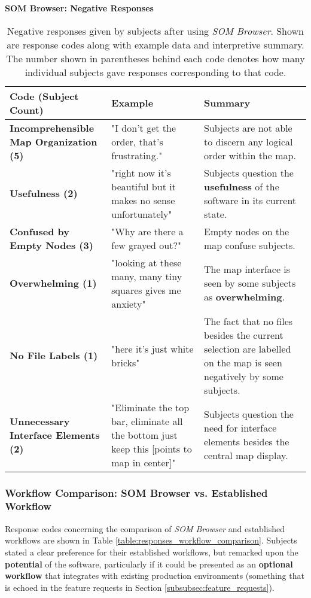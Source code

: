 \begin{table}[!htb]
  \renewcommand{\arraystretch}{1.2}
  \centering
  \textbf{SOM Browser: Negative Responses} \\ [3mm]
  \footnotesize
  \colorbox{light-bg}{
  \begin{tabular}{ p{4.0cm} p{4.75cm} p{4.75cm} }
  \hline
    \textbf{Code (Subject Count)} & \textbf{Example} & \textbf{Summary} \\
    \hline
    \textbf{Incomprehensible Map Organization (5)}
    &
    "I don't get the order, that’s frustrating."
    &
    Subjects are not able to discern any logical order within the map.
    \\
    \textbf{Usefulness (2)}
    &
    "right now it's beautiful but it makes no sense unfortunately"
    &
    Subjects question the \textbf{usefulness} of the software in its current
    state.
    \\
    \textbf{Confused by Empty Nodes (3)}
    &
    "Why are there a few grayed out?"
    &
    Empty nodes on the map confuse subjects.
    \\
    \textbf{Overwhelming (1)}
    &
    "looking at these many, many tiny squares gives me anxiety"
    &
    The map interface is seen by some subjects as \textbf{overwhelming}.
    \\
    \textbf{No File Labels (1)}
    &
    "here it’s just white bricks"
    &
    The fact that no files besides the current selection are labelled on the map
    is seen negatively by some subjects.
    \\
    \textbf{Unnecessary Interface Elements (2)}
    &
    "Eliminate the top bar, eliminate all the bottom just keep this [points to
    map in center]"
    &
    Subjects question the need for interface elements besides the central map
    display.
    \\
  \end{tabular}}
  \caption[\textit{SOM Browser}: Negative Responses]{Negative responses given
  by subjects after using \textit{SOM Browser}. Shown are response codes along
  with example data and interpretive summary. The number shown in parentheses
  behind each code denotes how many individual subjects gave responses
  corresponding to that code.}
  \label{table:responses_som-browser_negative}
\end{table}



\subsubsection{Workflow Comparison: SOM Browser vs. Established Workflow}
\label{subsubsec:workflow_comparison}
Response codes concerning the comparison of \textit{SOM Browser} and established
workflows are shown in Table \ref{table:responses_workflow_comparison}. Subjects
stated a clear preference for their established workflows, but remarked upon the
\textbf{potential} of the software, particularly if it could be presented as an
\textbf{optional workflow} that integrates with existing production environments
(something that is echoed in the feature requests in Section
\ref{subsubsec:feature_requests}).

